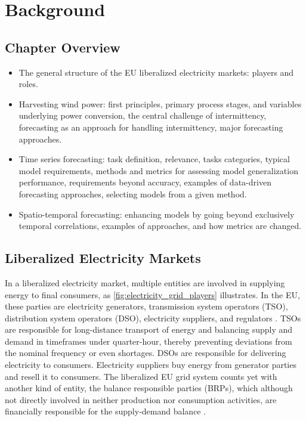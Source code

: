 \graphicspath{{./figures/background/}}

\chapter{Background}

\section*{Chapter Overview}
\begin{itemize}
    \item The general structure of the EU liberalized electricity markets: players and roles.
    \item Harvesting wind power: first principles, primary process stages, and variables underlying power conversion, the central challenge of intermittency, forecasting as an approach for handling intermittency, major forecasting approaches.
    \item Time series forecasting: task definition, relevance, tasks categories, typical model requirements, methods and metrics for assessing model generalization performance, requirements beyond accuracy, examples of data-driven forecasting approaches, selecting models from a given method.
    \item Spatio-temporal forecasting: enhancing models by going beyond exclusively temporal correlations, examples of approaches, and how metrics are changed.
\end{itemize}
\pagebreak

\section{Liberalized Electricity Markets}

In a liberalized electricity market, multiple entities are involved in supplying energy to final consumers, as \ref{fig:electricity_grid_players} illustrates.
In the EU, these parties are electricity generators, transmission system operators (TSO), distribution system operators (DSO), electricity suppliers, and regulators \cite{erbach2016market}.
TSOs are responsible for long-distance transport of energy and balancing supply and demand in timeframes under quarter-hour, thereby preventing deviations from the nominal frequency or even shortages.
DSOs are responsible for delivering electricity to consumers.
Electricity suppliers buy energy from generator parties and resell it to consumers.
The liberalized EU grid system counts yet with another kind of entity, the balance responsible parties (BRPs), which although not directly involved in neither production nor consumption activities, are financially responsible for the supply-demand balance \cite{erbach2016market}.

